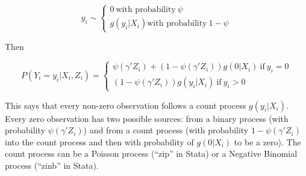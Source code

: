 \begin{equation}
y_i \sim \left\{
 \begin{array}{c}
0 \  \mbox{with probability} \ \psi \\    g(y_i | X_i)   \mbox{with
  probability} \ 1- \psi
 \end{array} \right.
\end{equation}

Then 

\begin{equation}
P(Y_i=y_i | X_i, Z_i) = \left\{
 \begin{array}{c}
\psi(\gamma' Z_i) + (1- \psi(\gamma' Z_i) ) g(0 | X_i)  \  \mbox{if} \ y_i=0 \\  (1- \psi(\gamma' Z_i) ) g(y_i | X_i)  \  \mbox{if} \ y_i>0
 \end{array} \right.
\end{equation}

This says that every non-zero observation follows a count process
$g(y_i|X_i)$. Every zero observation has two possible sources: from a
binary process (with probability $\psi(\gamma' Z_i)$) and from a count
process (with probability $1- \psi(\gamma' Z_i)$ into the count
process and then with probability of $g(0|X_i)$ to be a zero).  The
count process can be a Poisson process (``zip'' in Stata) or a
Negative Binomial process (``zinb'' in Stata).
